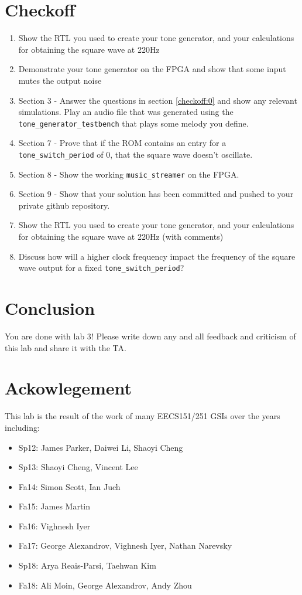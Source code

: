 \documentclass[11pt]{article}
\begin{document}
\section{Checkoff}
\begin{enumerate}
  \item Show the RTL you used to create your tone generator, and your calculations for obtaining the square wave at 220Hz
  \item Demonstrate your tone generator on the FPGA and show that some input mutes the output noise
  \item Section 3 - Answer the questions in section \ref{checkoff:0} and show any relevant simulations.  Play an audio file that was generated using the \verb|tone_generator_testbench| that plays some melody you define.
  \item Section 7 - Prove that if the ROM contains an entry for a \verb|tone_switch_period| of 0, that the square wave doesn't oscillate.
  \item Section 8 - Show the working \verb|music_streamer| on the FPGA.
  \item Section 9 - Show that your solution has been committed and pushed to your private github repository.
  \item Show the RTL you used to create your tone generator, and your calculations for obtaining the square wave at 220Hz (with comments)
  \item Discuss how will a higher clock frequency impact the frequency of the square wave output for a fixed \verb|tone_switch_period|?
\end{enumerate}

\section{Conclusion}
You are done with lab 3! Please write down any and all feedback and criticism of this lab and share it with the TA.

\section*{Ackowlegement}
This lab is the result of the work of many EECS151/251 GSIs over the years including:
\begin{itemize}
\item Sp12: James Parker, Daiwei Li, Shaoyi Cheng
\item Sp13: Shaoyi Cheng, Vincent Lee
\item Fa14: Simon Scott, Ian Juch
\item Fa15: James Martin
\item Fa16: Vighnesh Iyer
\item Fa17: George Alexandrov, Vighnesh Iyer, Nathan Narevsky
\item Sp18: Arya Reais-Parsi, Taehwan Kim
\item Fa18: Ali Moin, George Alexandrov, Andy Zhou
\end{itemize}
\end{document}
